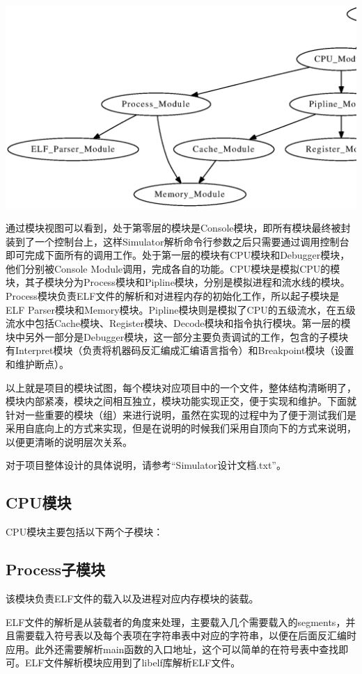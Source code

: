 \documentclass[12pt,a4paper]{article}
\begin{document}
\noindent\includegraphics[width=14cm]{module_view.eps}

通过模块视图可以看到，处于第零层的模块是Console模块，即所有模块最终被封装到了一个控制台上，这样Simulator解析命令行参数之后只需要通过调用控制台即可完成下面所有的调用工作。处于第一层的模块有CPU模块和Debugger模块，他们分别被Console Module调用，完成各自的功能。CPU模块是模拟CPU的模块，其子模块分为Process模块和Pipline模块，分别是模拟进程和流水线的模块。Process模块负责ELF文件的解析和对进程内存的初始化工作，所以起子模块是ELF Parser模块和Memory模块。Pipline模块则是模拟了CPU的五级流水，在五级流水中包括Cache模块、Register模块、Decode模块和指令执行模块。第一层的模块中另外一部分是Debugger模块，这一部分主要负责调试的工作，包含的子模块有Interpret模块（负责将机器码反汇编成汇编语言指令）和Breakpoint模块（设置和维护断点）。

以上就是项目的模块试图，每个模块对应项目中的一个文件，整体结构清晰明了，模块内部紧凑，模块之间相互独立，模块功能实现正交，便于实现和维护。下面就针对一些重要的模块（组）来进行说明，虽然在实现的过程中为了便于测试我们是采用自底向上的方式来实现，但是在说明的时候我们采用自顶向下的方式来说明，以便更清晰的说明层次关系。

对于项目整体设计的具体说明，请参考“Simulator设计文档.txt”。

\subsection{CPU模块}
CPU模块主要包括以下两个子模块：
\subsection{Process子模块}
该模块负责ELF文件的载入以及进程对应内存模块的装载。

ELF文件的解析是从装载者的角度来处理，主要载入几个需要载入的segments，并且需要载入符号表以及每个表项在字符串表中对应的字符串，以便在后面反汇编时应用。此外还需要解析main函数的入口地址，这个可以简单的在符号表中查找即可。ELF文件解析模块应用到了libelf库解析ELF文件。
\end{document}
